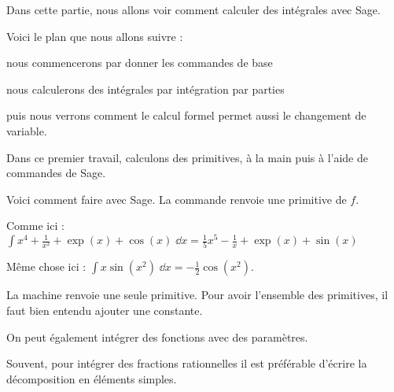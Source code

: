 

\newcommand{\Sage}{\texttt{Sage}}




\debuttexte


\diapo

Dans cette partie, nous allons voir comment calculer des intégrales avec Sage.

\change

Voici le plan que nous allons suivre :

\change

nous commencerons par donner les commandes de base

\change

nous calculerons des intégrales par intégration par parties

\change

puis nous verrons comment le calcul formel permet aussi le changement de variable.

\diapo

Dans ce premier travail, calculons des primitives, 
à la main puis à l'aide de commandes de Sage.


\diapo


\change

Voici comment faire avec Sage. La commande
 renvoie une primitive de $f$.

\change
Comme ici :
$\displaystyle\int x^4 + \frac{1}{x^2} + \exp(x)+ \cos(x) \; \dd x 
  = \frac15 x^5 - \frac1x + \exp(x) + \sin(x)$

\change

\change

\change

Même chose ici : $\displaystyle\int  x \sin(x^2) \; \dd x 
  = - \frac12\cos(x^2)$.
  
La machine renvoie une seule primitive. Pour avoir l'ensemble des primitives, il faut
bien entendu ajouter une constante.

\change

\change

\change

On peut également intégrer des fonctions avec des paramètres.

\change
Souvent, pour intégrer des fractions rationnelles il est préférable d'écrire la décomposition en éléments simples.



